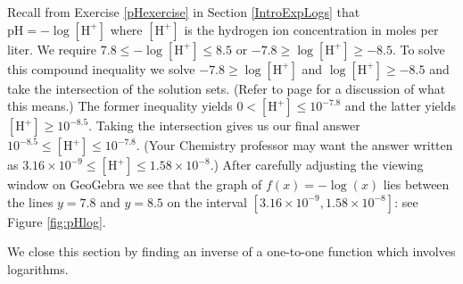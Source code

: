 {
Recall from Exercise \ref{pHexercise} in Section \ref{IntroExpLogs} that $\mbox{pH} = -\log[\mbox{H}^{+}]$ where $[\mbox{H}^{+}]$ is the hydrogen ion concentration in moles per liter.  We require $7.8 \leq -\log[\mbox{H}^{+}] \leq 8.5$ or $-7.8 \geq \log[\mbox{H}^{+}] \geq -8.5$.  To solve this compound inequality we solve $-7.8 \geq \log[\mbox{H}^{+}]$ and $ \log[\mbox{H}^{+}] \geq -8.5$ and take the intersection of the solution sets. (Refer to page \pageref{intersectionunion} for a discussion of what this means.)  The former inequality yields $0 < [\mbox{H}^{+}] \leq 10^{-7.8}$ and the latter yields $[\mbox{H}^{+}] \geq 10^{-8.5}$.  Taking the intersection gives us our final answer $10^{-8.5} \leq [\mbox{H}^{+}] \leq 10^{-7.8}$.  (Your Chemistry professor may want the answer written as $3.16 \times 10^{-9} \leq [\mbox{H}^{+}] \leq 1.58 \times 10^{-8}$.)  After carefully adjusting the viewing window on GeoGebra we see that the graph of $f(x) = -\log(x)$ lies between the lines $y = 7.8$ and $y = 8.5$ on the interval $[3.16 \times 10^{-9}, 1.58 \times 10^{-8}]$: see Figure \ref{fig:pHlog}.


{}
}

\medskip

We close this section by finding an inverse of a one-to-one function which involves logarithms.

\medskip

